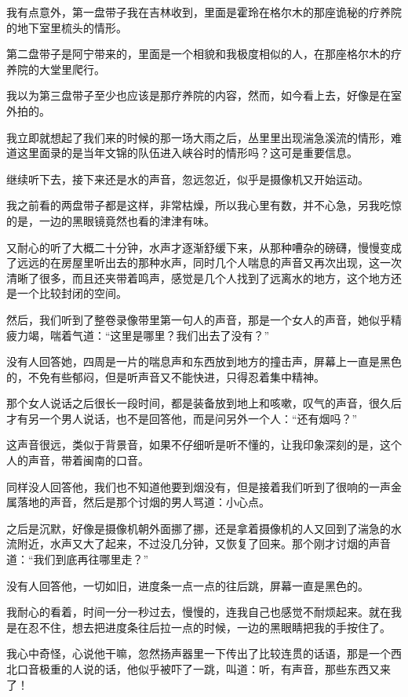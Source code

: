 我有点意外，第一盘带子我在吉林收到，里面是霍玲在格尔木的那座诡秘的疗养院的地下室里梳头的情形。

第二盘带子是阿宁带来的，里面是一个相貌和我极度相似的人，在那座格尔木的疗养院的大堂里爬行。

我以为第三盘带子至少也应该是那疗养院的内容，然而，如今看上去，好像是在室外拍的。

我立即就想起了我们来的时候的那一场大雨之后，丛里里出现湍急溪流的情形，难道这里面录的是当年文锦的队伍进入峡谷时的情形吗？这可是重要信息。

继续听下去，接下来还是水的声音，忽远忽近，似乎是摄像机又开始运动。

我之前看的两盘带子都是这样，非常枯燥，所以我心里有数，并不心急，另我吃惊的是，一边的黑眼镜竟然也看的津津有味。

又耐心的听了大概二十分钟，水声才逐渐舒缓下来，从那种嘈杂的磅礴，慢慢变成了远远的在房屋里听出去的那种水声，同时几个人喘息的声音又再次出现，这一次清晰了很多，而且还夹带着鸣声，感觉是几个人找到了远离水的地方，这个地方还是一个比较封闭的空间。

然后，我们听到了整卷录像带里第一句人的声音，那是一个女人的声音，她似乎精疲力竭，喘着气道：“这里是哪里？我们出去了没有？”

没有人回答她，四周是一片的喘息声和东西放到地方的撞击声，屏幕上一直是黑色的，不免有些郁闷，但是听声音又不能快进，只得忍着集中精神。

那个女人说话之后很长一段时间，都是装备放到地上和咳嗽，叹气的声音，很久后才有另一个男人说话，也不是回答他，而是问另外一个人：“还有烟吗？”

这声音很远，类似于背景音，如果不仔细听是听不懂的，让我印象深刻的是，这个人的声音，带着闽南的口音。

同样没人回答他，我们也不知道他要到烟没有，但是接着我们听到了很响的一声金属落地的声音，然后是那个讨烟的男人骂道：小心点。

之后是沉默，好像是摄像机朝外面挪了挪，还是拿着摄像机的人又回到了湍急的水流附近，水声又大了起来，不过没几分钟，又恢复了回来。那个刚才讨烟的声音道：“我们到底再往哪里走？”

没有人回答他，一切如旧，进度条一点一点的往后跳，屏幕一直是黑色的。

我耐心的看着，时间一分一秒过去，慢慢的，连我自己也感觉不耐烦起来。就在我是在忍不住，想去把进度条往后拉一点的时候，一边的黑眼睛把我的手按住了。

我心中奇怪，心说他干嘛，忽然扬声器里一下传出了比较连贯的话语，那是一个西北口音极重的人说的话，他似乎被吓了一跳，叫道：听，有声音，那些东西又来了！

